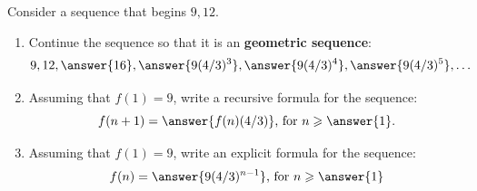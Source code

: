 \documentclass[nooutcomes]{ximera}
\begin{document}
\begin{problem}
Consider a sequence that begins $9, 12$.    
\begin{enumerate}
\item Continue the sequence so that it is an \textbf{geometric sequence}:
\[
9, 12, \answer{16}, \answer{9(4/3)^3}, \answer{9(4/3)^4}, \answer{9(4/3)^5}, \dots
\]
\item Assuming that $f(1)=9$, write a recursive formula for the sequence:
\[
f(n+1)=\answer{f(n)(4/3)}\textrm{, for }n\ge\answer{1}.
\]
\item Assuming that $f(1)=9$, write an explicit formula for the sequence: 
\[
f(n)=\answer{9(4/3)^{n-1}}\textrm{, for }n\ge\answer{1}
\]
\end{enumerate}
\end{problem}
\end{document}
